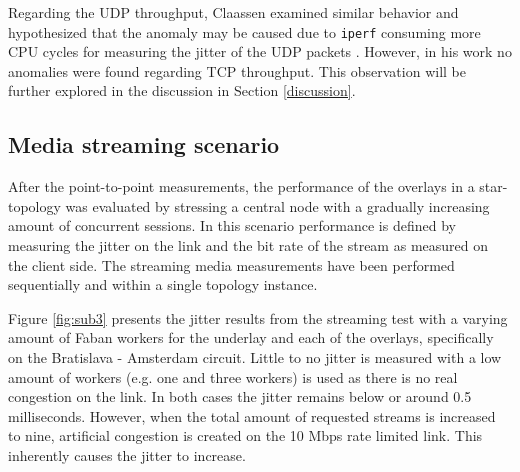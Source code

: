 Regarding the UDP throughput, Claassen examined similar behavior and hypothesized that the anomaly may be caused due to \texttt{iperf} consuming more CPU cycles for measuring the jitter of the UDP packets \cite{jorisclaassen2015}. However, in his work no anomalies were found regarding TCP throughput. This observation will be further explored in the discussion in Section \ref{discussion}. 

\subsection{Media streaming scenario}
After the point-to-point measurements, the performance of the overlays in a star-topology was evaluated by stressing a central node with a gradually increasing amount of concurrent sessions. In this scenario performance is defined by measuring the jitter on the link and the bit rate of the stream as measured on the client side. The streaming media measurements have been performed sequentially and within a single topology instance. 

Figure \ref{fig:sub3} presents the jitter results from the streaming test with a varying amount of Faban workers for the underlay and each of the overlays, specifically on the Bratislava - Amsterdam circuit. Little to no jitter is measured with a low amount of workers (e.g. one and three workers) is used as there is no real congestion on the link. In both cases the jitter remains below or around 0.5 milliseconds.  However, when the total amount of requested streams is increased to nine, artificial congestion is created on the 10 Mbps rate limited link. This inherently causes the jitter to increase. 

